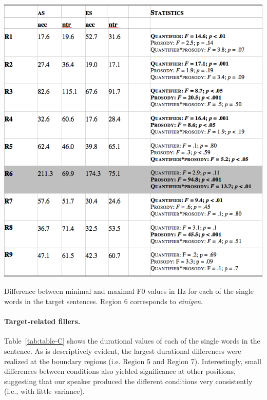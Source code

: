 \documentclass[fleqn,reqno,10pt,draft]{article}
\begin{document}
\begin{table}
  \centering
  
  \includegraphics[width=\textwidth]{../pictures/Acoustics/Table-B.png}

  \caption{Difference between minimal and maximal F0 values in Hz for
    each of the single words in the target sentences. Region 6
    corresponds to \emph{einigen}.} 
  \label{tab:table-B}
\end{table}

\paragraph{Target-related fillers.} Table~\ref{tab:table-C} shows the
durational values of each of the single words in the sentence. As is
descriptively evident, the largest durational differences were
realized at the boundary regions (i.e. Region 5 and Region
7). Interestingly, small differences between conditions also yielded
significance at other positions, suggesting that our speaker produced
the different conditions very consistently (i.e., with little
variance).
\end{document}
